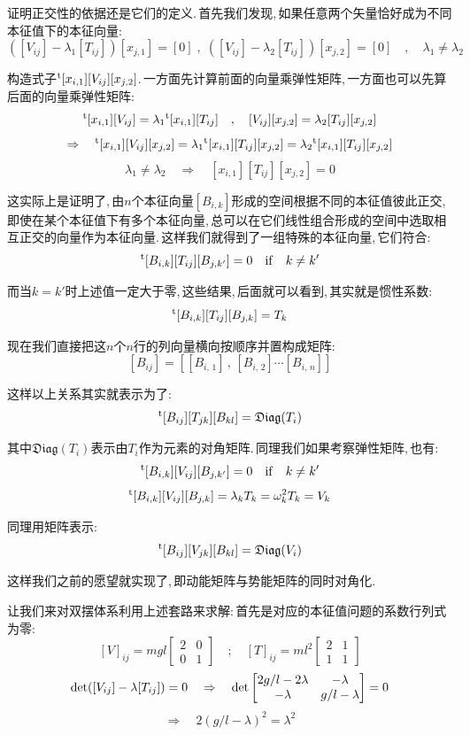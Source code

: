 证明正交性的依据还是它们的定义.\,首先我们发现,\,如果任意两个矢量恰好成为不同本征值下的本征向量:
\[([V_{ij}]-\lambda_1 [T_{ij}])[x_{j,1}]=[0]\;,\;([V_{ij}]-\lambda_2 [T_{ij}])[x_{j,2}]=[0]\quad,\quad \lambda_1\neq\lambda_2\]

构造式子$\phantom{}^{\rm t}[x_{i,1}][V_{ij}][x_{j,2}]$.\,一方面先计算前面的向量乘弹性矩阵,\,一方面也可以先算后面的向量乘弹性矩阵:
\[\phantom{}^{\rm t}[x_{i,1}][V_{ij}]=\lambda_1\phantom{}^{\rm t}[x_{i,1}][T_{ij}]\quad,\quad [V_{ij}][x_{j,2}]=\lambda_2[T_{ij}][x_{j,2}]\]
\[\Rightarrow \quad \phantom{}^{\rm t}[x_{i,1}][V_{ij}][x_{j,2}]=\lambda_1\phantom{}^{\rm t}[x_{i,1}][T_{ij}][x_{j,2}]=\lambda_2\phantom{}^{\rm t}[x_{i,1}][T_{ij}][x_{j,2}]\]
\[\lambda_1\neq \lambda_2 \quad\Rightarrow\quad [x_{i,1}][T_{ij}][x_{j,2}]=0\]

这实际上是证明了,\,由$n$个本征向量$[B_{i,k}]$形成的空间根据不同的本征值彼此正交,\,即使在某个本征值下有多个本征向量,\,总可以在它们线性组合形成的空间中选取相互正交的向量作为本征向量.\,这样我们就得到了一组特殊的本征向量,\,它们符合:
\[\phantom{}^{\rm t}[B_{i,k}][T_{ij}][B_{j,k'}]=0\quad{\rm if}\quad k\neq k'\]

而当$k=k'$时上述值一定大于零,\,这些结果,\,后面就可以看到,\,其实就是惯性系数:
\[\phantom{}^{\rm t}[B_{i,k}][T_{ij}][B_{j,k}]=T_k\]

现在我们直接把这$n$个$n$行的列向量横向按顺序并置构成矩阵:
\[[B_{ij}]=[[B_{i,\,1}]\,,\,[B_{i,\,2}]\cdots [B_{i,\,n}]]\]

这样以上关系其实就表示为了:
\[\phantom{}^{\rm t}[B_{ij}][T_{jk}][B_{kl}]=\mathfrak{Diag}(T_i)\]

其中$\mathfrak{Diag}(T_i)$表示由$T_i$作为元素的对角矩阵.\,同理我们如果考察弹性矩阵,\,也有:
\[\phantom{}^{\rm t}[B_{i,k}][V_{ij}][B_{j,k'}]=0\quad{\rm if}\quad k\neq k'\]
\[\phantom{}^{\rm t}[B_{i,k}][V_{ij}][B_{j,k}]=\lambda_k T_k=\omega_k^2T_k=V_k\]

同理用矩阵表示:
\[\phantom{}^{\rm t}[B_{ij}][V_{jk}][B_{kl}]=\mathfrak{Diag}(V_i)\]

这样我们之前的愿望就实现了,\,即动能矩阵与势能矩阵的同时对角化.

\vspace{1cm}

让我们来对双摆体系利用上述套路来求解:\,首先是对应的本征值问题的系数行列式为零:
\[[V]_{ij}=mgl\begin{bmatrix}2&0\\0&1\end{bmatrix}\quad;\quad [T]_{ij}=ml^2\begin{bmatrix}2&1\\1&1\end{bmatrix}\]
\[{\rm det}([V_{ij}]-\lambda [T_{ij}])=0\quad\Rightarrow\quad {\rm det}\begin{bmatrix}2g/l -2\lambda &-\lambda \\-\lambda&g/l -\lambda \end{bmatrix}=0\]
\[\Rightarrow\quad 2(g/l-\lambda)^2=\lambda^2\]

